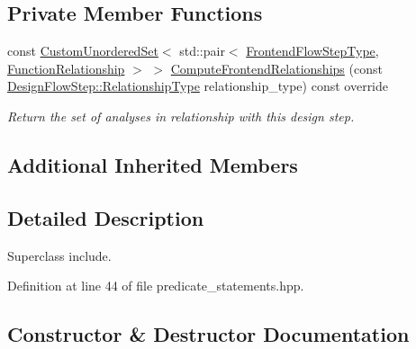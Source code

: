 \subsection*{Private Member Functions}
\begin{DoxyCompactItemize}
\item 
const \hyperlink{classCustomUnorderedSet}{Custom\+Unordered\+Set}$<$ std\+::pair$<$ \hyperlink{frontend__flow__step_8hpp_afeb3716c693d2b2e4ed3e6d04c3b63bb}{Frontend\+Flow\+Step\+Type}, \hyperlink{classFrontendFlowStep_af7cf30f2023e5b99e637dc2058289ab0}{Function\+Relationship} $>$ $>$ \hyperlink{classPredicateStatements_a28bd4193c0bfa7f18a95d54dab7e3c47}{Compute\+Frontend\+Relationships} (const \hyperlink{classDesignFlowStep_a723a3baf19ff2ceb77bc13e099d0b1b7}{Design\+Flow\+Step\+::\+Relationship\+Type} relationship\+\_\+type) const override
\begin{DoxyCompactList}\small\item\em Return the set of analyses in relationship with this design step. \end{DoxyCompactList}\end{DoxyCompactItemize}
\subsection*{Additional Inherited Members}


\subsection{Detailed Description}
Superclass include. 

Definition at line 44 of file predicate\+\_\+statements.\+hpp.



\subsection{Constructor \& Destructor Documentation}
\mbox{\label{classPredicateStatements_a2b3d9e0854bdf22630147df2f1e43ef4}} 
